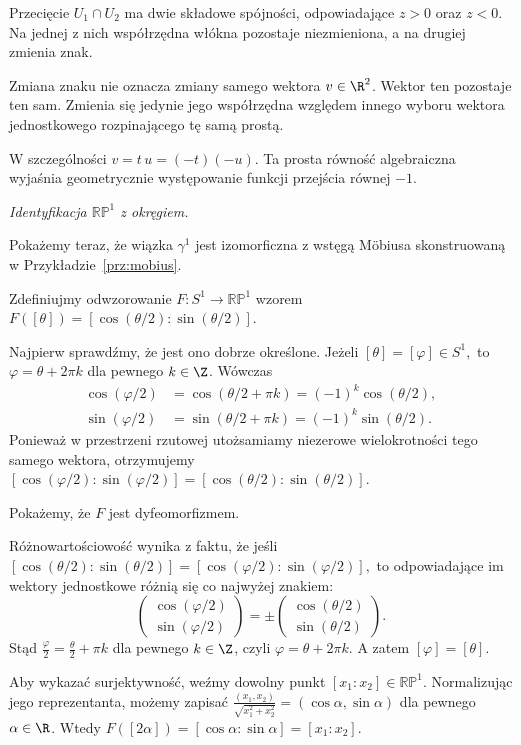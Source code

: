 \begin{przyklad}
Przecięcie $U_1\cap U_2$ ma dwie składowe
spójności, odpowiadające $z>0$ oraz $z<0$.
Na jednej z nich współrzędna włókna
pozostaje niezmieniona, a na drugiej
zmienia znak.

Zmiana znaku nie oznacza zmiany samego
wektora $v\in\R^2$.
Wektor ten pozostaje ten sam.
Zmienia się jedynie jego współrzędna
względem innego wyboru wektora jednostkowego
rozpinającego tę samą prostą.

W szczególności
$
v=t\,u=(-t)(-u).
$
Ta prosta równość algebraiczna wyjaśnia
geometrycznie występowanie funkcji przejścia
równej $-1$.

\medskip
\emph{Identyfikacja $\mathbb{RP}^1$ z okręgiem.}

Pokażemy teraz, że wiązka $\gamma^1$
jest izomorficzna z wstęgą Möbiusa
skonstruowaną w Przykładzie~\ref{prz:mobius}.


Zdefiniujmy odwzorowanie
$
F\colon S^1\longrightarrow\mathbb{RP}^1
$
wzorem $F([\theta]) = [\cos(\theta/2):\sin(\theta/2)]$.

Najpierw sprawdźmy, że jest ono dobrze określone.
Jeżeli
$
[\theta]=[\varphi]\in S^1,
$
to
$
\varphi=\theta+2\pi k
$
dla pewnego $k\in\Z$.
Wówczas
\[
\begin{aligned}
\cos(\varphi/2)
&=\cos(\theta/2+\pi k)
=(-1)^k\cos(\theta/2),\\
\sin(\varphi/2)
&=\sin(\theta/2+\pi k)
=(-1)^k\sin(\theta/2).
\end{aligned}
\]
Ponieważ w przestrzeni rzutowej
utożsamiamy niezerowe wielokrotności
tego samego wektora, otrzymujemy
$
[\cos(\varphi/2):\sin(\varphi/2)]
=
[\cos(\theta/2):\sin(\theta/2)].
$

Pokażemy, że $F$ jest dyfeomorfizmem.

Różnowartościowość wynika z faktu, że
jeśli
$
[\cos(\theta/2):\sin(\theta/2)]
=
[\cos(\varphi/2):\sin(\varphi/2)],
$
to odpowiadające im wektory jednostkowe
różnią się co najwyżej znakiem:
\[
\begin{pmatrix}
\cos(\varphi/2)\\
\sin(\varphi/2)
\end{pmatrix}
=
\pm
\begin{pmatrix}
\cos(\theta/2)\\
\sin(\theta/2)
\end{pmatrix}.
\]
Stąd
$
\frac{\varphi}{2}
=
\frac{\theta}{2}+\pi k
$
dla pewnego $k\in\Z$, czyli
$
\varphi=\theta+2\pi k.
$
A zatem $[\varphi]=[\theta]$.

Aby wykazać surjektywność, weźmy dowolny
punkt $[x_1:x_2]\in\mathbb{RP}^1$.
Normalizując jego reprezentanta, możemy zapisać $\frac{(x_1,x_2)}{\sqrt{x_1^2+x_2^2}} = (\cos\alpha,\sin\alpha)$
dla pewnego $\alpha\in\R$.
Wtedy
$
F([2\alpha])
=
[\cos\alpha:\sin\alpha]
=
[x_1:x_2].
$


\end{przyklad}
